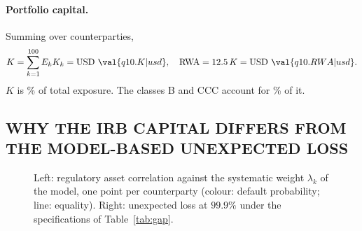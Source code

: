\paragraph{Portfolio capital.}
Summing over counterparties,
\[
K=\sum_{k=1}^{100}E_kK_k=\text{USD }\val{q10.K|usd},\quad \mathrm{RWA}=12.5\,K=\text{USD }\val{q10.RWA|usd} .
\]
$K$ is \% of total exposure. The classes B and CCC account for \% of it.

\subsection{WHY THE IRB CAPITAL DIFFERS FROM THE MODEL-BASED UNEXPECTED LOSS}
\label{subsec:irbgap}
\begin{table}[tb]
\caption{From the IRB capital to the model-based unexpected loss at $99.9\%$ (reference run).}
\label{tab:gap}
\centering
{}
\end{table}

\begin{figure}[tb]
\centering
{}
\caption{Left: regulatory asset correlation against the systematic weight $\lambda_k$ of the model, one point per counterparty (colour: default probability; line: equality). Right: unexpected loss at $99.9\%$ under the specifications of Table~\ref{tab:gap}.}
\label{fig:irb}
\end{figure}

